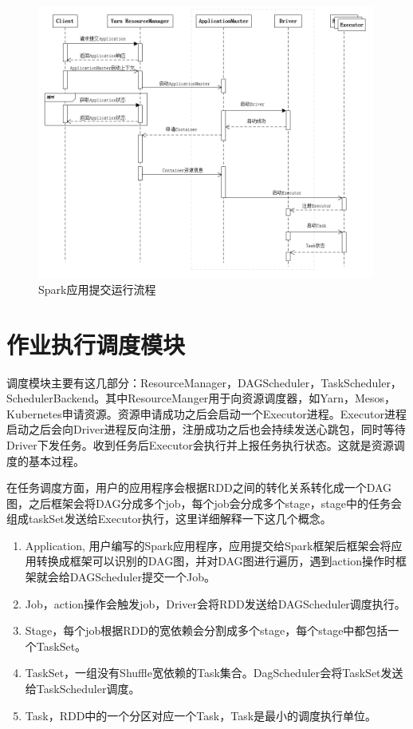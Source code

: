 \begin{figure}[htbp]
    \centering
    \includegraphics[width=0.99\textwidth]{Img/spark-submit-time.png}
    \caption{Spark应用提交运行流程}
    \label{fig:spark-submit-job}
\end{figure}


\section{作业执行调度模块}

调度模块主要有这几部分：ResourceManager，DAGScheduler，TaskScheduler，SchedulerBackend。其中ResourceManger用于向资源调度器，如Yarn，Mesos，Kubernetes申请资源。资源申请成功之后会启动一个Executor进程。Executor进程启动之后会向Driver进程反向注册，注册成功之后也会持续发送心跳包，同时等待Driver下发任务。收到任务后Executor会执行并上报任务执行状态。这就是资源调度的基本过程。

在任务调度方面，用户的应用程序会根据RDD之间的转化关系转化成一个DAG图，之后框架会将DAG分成多个job，每个job会分成多个stage，stage中的任务会组成taskSet发送给Executor执行，这里详细解释一下这几个概念。

\begin{enumerate}
    \item Application, 用户编写的Spark应用程序，应用提交给Spark框架后框架会将应用转换成框架可以识别的DAG图，并对DAG图进行遍历，遇到action操作时框架就会给DAGScheduler提交一个Job。
    \item Job，action操作会触发job，Driver会将RDD发送给DAGScheduler调度执行。
    \item Stage，每个job根据RDD的宽依赖会分割成多个stage，每个stage中都包括一个TaskSet。
    \item TaskSet，一组没有Shuffle宽依赖的Task集合。DagScheduler会将TaskSet发送给TaskScheduler调度。
    \item Task，RDD中的一个分区对应一个Task，Task是最小的调度执行单位。
\end{enumerate}

